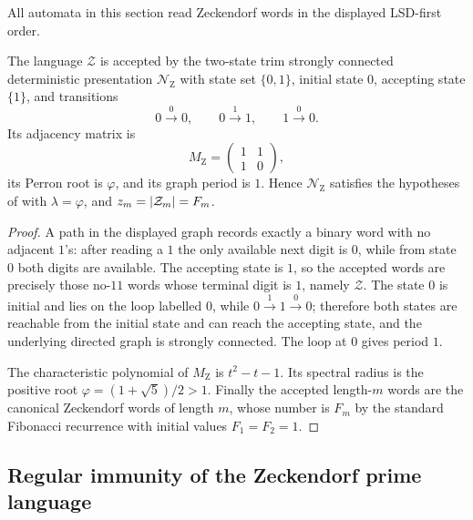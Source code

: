 All automata in this section read Zeckendorf words in the displayed
LSD-first order.

\begin{lemma}
  \label{lem:zeckendorf-canonical-presentation}
  The language \(\mathcal Z\) is accepted by the two-state trim
  strongly connected deterministic presentation \(\mathcal N_{\mathrm Z}\)
  with state set \(\{0,1\}\), initial state \(0\), accepting state
  \(\{1\}\), and transitions
  \[
    0\xrightarrow{0}0,\qquad
    0\xrightarrow{1}1,\qquad
    1\xrightarrow{0}0.
  \]
  Its adjacency matrix is
  \[
    M_{\mathrm Z}=
    \begin{pmatrix}
      1&1\\
      1&0
    \end{pmatrix},
  \]
  its Perron root is \(\varphi\), and its graph period is \(1\). Hence
  \(\mathcal N_{\mathrm Z}\) satisfies the hypotheses of
   with \(\lambda=\varphi\), and
  \(z_m=\lvert \mathcal Z_m \rvert=F_m\).
\end{lemma}

\begin{proof}
  A path in the displayed graph records exactly a binary word with no
  adjacent \(1\)'s: after reading a \(1\) the only available next digit
  is \(0\), while from state \(0\) both digits are available. The
  accepting state is \(1\), so the accepted words are precisely those
  no-\(11\) words whose terminal digit is \(1\), namely
  \(\mathcal Z\). The state \(0\) is initial and lies on the loop
  labelled \(0\), while \(0\xrightarrow{1}1\xrightarrow{0}0\); therefore
  both states are reachable from the initial state and can reach the
  accepting state, and the underlying directed graph is strongly
  connected. The loop at \(0\) gives period \(1\).

  The characteristic polynomial of \(M_{\mathrm Z}\) is
  \(t^2-t-1\). Its spectral radius is the positive root
  \(\varphi=(1+\sqrt5)/2>1\). Finally the accepted length-\(m\) words
  are the canonical Zeckendorf words of length \(m\), whose number is
  \(F_m\) by the standard Fibonacci recurrence with initial values
  \(F_1=F_2=1\).
\end{proof}

\subsection{Regular immunity of the Zeckendorf prime language}
\label{subsec:zeckendorf-regular-immunity}

